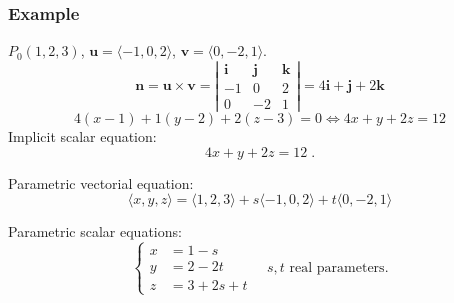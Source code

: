 \begin{frame}
 \frametitle{Example}

$P_0(1,2,3)$, $\textbf{u}=\langle -1,0,2\rangle$, $\textbf{v} = \langle 0,-2,1\rangle$.\pause
%
$$\textbf{n} = \textbf{u} \times \textbf{v} = \left| \begin{array}{ccc}
                           \textbf{i} & \textbf{j} & \textbf{k} \\
			   -1 & 0 & 2 \\
                           0 & -2 & 1
                          \end{array}
\right| = 4\textbf{i}+\textbf{j} +2\textbf{k}$$
%
$$4(x-1)+1(y-2) + 2(z-3) = 0 \Longleftrightarrow 4x+y+2z = 12$$
%
\pause Implicit scalar equation:
%
$$4x+y+2z = 12\; .$$

\pause Parametric vectorial equation:
%
$$\langle x, y, z \rangle = \langle 1,2,3\rangle + s\langle -1, 0, 2\rangle + t\langle 0,-2,1\rangle$$

\pause Parametric scalar equations:
%
$$\left\{ \begin{array}{ll}
           x & = 1 -s \\
           y & = 2-2t \\
           z & = 3 +2s +t
          \end{array}
\right. \quad s,t \text{ real parameters}.$$
%
\end{frame}